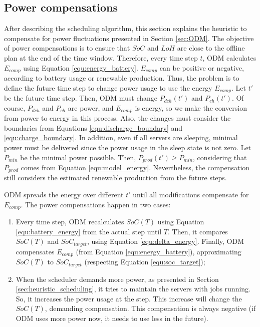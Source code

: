 \subsection{Power compensations}
\label{sec:power_compensation}

After describing the scheduling algorithm, this section explains the heuristic to compensate for power fluctuations presented in Section \ref{sec:ODM}. The objective of power compensations is to ensure that $SoC$ and $LoH$ are close to the offline plan at the end of the time window. Therefore, every time step $t$, ODM calculates $E_{comp}$ using Equation \ref{equ:energy_battery}. $E_{comp}$ can be positive or negative, according to battery usage or renewable production. Thus, the problem is to define the future time step to change power usage to use the energy $E_{comp}$. Let $t'$ be the future time step. Then, ODM must change $P_{dch}(t')$ and $P_{ch}(t')$. Of course, $P_{dch}$ and $P_{ch}$ are power, and $E_{comp}$ is energy, so we make the conversion from power to energy in this process. Also, the changes must consider the boundaries from Equations \ref{equ:discharge_boundary} and \ref{equ:charge_boundary}. In addition, even if all servers are sleeping, minimal power must be delivered since the power usage in the sleep state is not zero. Let $P_{min}$ be the minimal power possible. Then, $P_{prod}(t') \ge P_{min}$, considering that $P_{prod}$ comes from Equation \ref{equ:model_energy}. Nevertheless, the compensation still considers the estimated renewable production from the future steps.

ODM spreads the energy over different $t'$ until all modifications compensate for $E_{comp}$. The power compensations happen in two cases:
\begin{enumerate}
    \item Every time step, ODM recalculates $SoC(T)$ using Equation \ref{equ:battery_energy} from the actual step until $T$. Then, it compares $SoC(T)$ and $SoC_{target}$, using Equation \ref{equ:delta_energy}. Finally, ODM compensates $E_{comp}$ (from Equation \ref{equ:energy_battery}), approximating $SoC(T)$ to $SoC_{target}$ (respecting Equation \ref{equ:soc_target});
    \item When the scheduler demands more power, as presented in Section \ref{sec:heuristic_scheduling}, it tries to maintain the servers with jobs running. So, it increases the power usage at the step. This increase will change the $SoC(T)$, demanding compensation. This compensation is always negative (if ODM uses more power now, it needs to use less in the future).
\end{enumerate}


